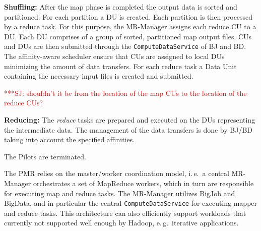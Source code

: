 \documentclass{sig-alternate}
\newcommand{\jhanote}[1]{ {\textcolor{red} { ***SJ: #1 }}}
\newcommand{\alnote}[1]{ {\textcolor{blue} { ***andreL: #1 }}}
\newcommand{\pnote}[1]{ {\textcolor{magenta} { ***pradeep: #1 }}}
\newcommand{\alnote}[1]{}
\newcommand{\pnote}[1]{}
\newcommand{\jhanote}[1]{}
\newcommand{\pilots}{Pilots\xspace}
\newcommand{\mrmg}{MR-Manager\xspace}
\newcommand{\cus}{CUs\xspace}
\newcommand{\du}{DU\xspace}
\newcommand{\dus}{DUs\xspace}
\begin{document}
\begin{compactenum}[A.]
\item \textbf{Shuffling:} %
  After the map phase is completed the output data is sorted and
  partitioned. For each partition a \du is created. Each partition is
  then processed by a reduce task. For this purpose, the \mrmg assigns
  each reduce CU to a DU. Each DU comprises of a group of sorted,
  partitioned map output files. \cus and \dus are then submitted
  through the \texttt{ComputeDataService} of BJ and BD. The
  affinity-aware scheduler ensure that \cus are assigned to local \dus
  minimizing the amount of data transfers.  For each reduce task a
  Data Unit containing the necessary input files is created and
  submitted. %

\jhanote{shouldn't it
    be from the location of the map CUs to the location of the reduce
    CUs?} 
		
	
\item \textbf{Reducing:} The {\it reduce} tasks are prepared and
  executed on the DUs representing the intermediate data.
  The management of the data transfers is done by BJ/BD taking into account the 
  specified affinities.
	
\item The \pilots are terminated.

\end{compactenum}

The PMR relies on the master/worker coordination model, i.\,e.\ a
central \mrmg orchestrates a set of MapReduce workers, which in turn
are responsible for executing map and reduce tasks. The \mrmg utilizes
BigJob and BigData, and in particular the central
\texttt{ComputeDataService} for executing mapper and reduce tasks.
This architecture can also efficiently support workloads that
currently not supported well enough by Hadoop, e.\,g.\ iterative
applications.
\end{document}
